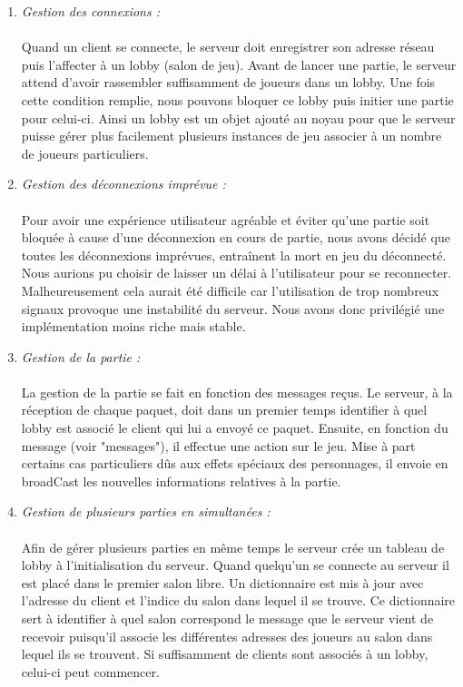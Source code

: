 \documentclass[a4paper,11pt]{article}
\begin{document}
\begin{enumerate}[label=(\roman*)]
	\item \textit{Gestion des connexions :} \\\\
	Quand un client se connecte, le serveur doit enregistrer son adresse réseau puis l’affecter à un lobby (salon de jeu). Avant de lancer une partie, le serveur attend d’avoir rassembler suffisamment de joueurs dans un lobby. Une fois cette condition remplie, nous pouvons bloquer ce lobby puis initier une partie pour celui-ci. Ainsi un lobby est un objet ajouté au noyau pour que le serveur puisse gérer plus facilement plusieurs instances de jeu associer à un nombre de joueurs particuliers.\\

	
	\item \textit{Gestion des déconnexions imprévue :} \\\\
	Pour avoir une expérience utilisateur agréable et éviter qu’une partie soit bloquée à cause d’une déconnexion en cours de partie, nous avons décidé que toutes les déconnexions imprévues, entraînent la mort en jeu du déconnecté. Nous aurions pu choisir de laisser un délai à l’utilisateur pour se reconnecter. Malheureusement cela aurait été difficile car l’utilisation de trop nombreux signaux provoque une instabilité du serveur. Nous avons donc privilégié une implémentation moins riche mais stable.\\

	\item \textit{Gestion de la partie :} \\\\
	La gestion de la partie se fait en fonction des messages reçus. Le serveur, à la réception de chaque paquet, doit dans un premier temps identifier à quel lobby est associé le client qui lui a envoyé ce paquet. Ensuite, en fonction du message (voir "messages"), il effectue une action sur le jeu. Mise à part certains cas particuliers dûs aux effets spéciaux des personnages, il envoie en broadCast les nouvelles informations relatives à la partie.\\

\newpage

	\item \textit{Gestion de plusieurs parties en simultanées :} \\\\
	Afin de gérer plusieurs parties en même temps le serveur crée un tableau de lobby à l'initialisation du serveur. Quand quelqu’un se connecte au serveur il est placé dans le premier salon libre. Un dictionnaire est mis à jour avec l’adresse du client et l’indice du salon dans lequel il se trouve. Ce dictionnaire sert à identifier à quel salon correspond le message que le serveur vient de recevoir puisqu’il associe les différentes adresses des joueurs au salon dans lequel ils se trouvent. Si suffisamment de clients sont associés à un lobby, celui-ci peut commencer. \\


\end{enumerate}
\end{document}

